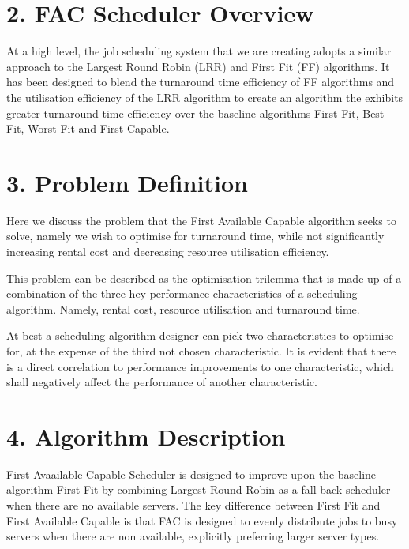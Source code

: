\documentclass[a4paper]{article} %
\begin{document}
\section*{2. FAC Scheduler Overview}

At a high level, the job scheduling system that we are creating adopts a similar approach to the Largest Round Robin (LRR) and First Fit (FF) algorithms. It has been designed to blend the turnaround time efficiency of FF algorithms and the utilisation efficiency of the LRR algorithm to create an algorithm the exhibits greater turnaround time efficiency over the baseline algorithms First Fit, Best Fit, Worst Fit and First Capable.
\newline

\section*{3. Problem Definition}

Here we discuss the problem that the First Available Capable algorithm seeks to solve, namely we wish to optimise for turnaround time, while not significantly increasing rental cost and decreasing resource utilisation efficiency.
\newline

This problem can be described as the optimisation trilemma that is made up of a combination of the three hey performance characteristics of a scheduling algorithm. Namely, rental cost, resource utilisation and turnaround time.
\newline

At best a scheduling algorithm designer can pick two characteristics to optimise for, at the expense of the third not chosen characteristic. It is evident that there is a direct correlation to performance improvements to one characteristic, which shall negatively affect the performance of another characteristic.  


\section*{4. Algorithm Description}

First Avaailable Capable Scheduler is designed to improve upon the baseline algorithm First Fit by combining Largest Round Robin as a fall back scheduler when there are no available servers. The key difference between First Fit and First Available Capable is that FAC is designed to evenly distribute jobs to busy servers when there are non available, explicitly preferring larger server types.
\end{document}
